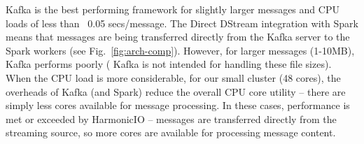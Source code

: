 \documentclass[conference]{IEEEtran}
\begin{document}
Kafka is the best performing framework for slightly larger messages and CPU loads of less than ~0.05 secs/message.
The Direct DStream integration with Spark means that messages are being transferred directly from the Kafka server to the Spark workers (see Fig.~\ref{fig:arch-comp}).  
However, for larger messages (1-10MB), Kafka performs poorly (%
Kafka is not intended for handling these file sizes). When the CPU load is more considerable, for our small cluster (48 cores), the overheads of Kafka (and Spark) reduce the overall CPU core utility -- there are simply less cores available for message processing. %
In these cases, performance is met or exceeded by HarmonicIO -- messages are transferred directly from the streaming source, so more cores are available for processing message content.



\end{document}
